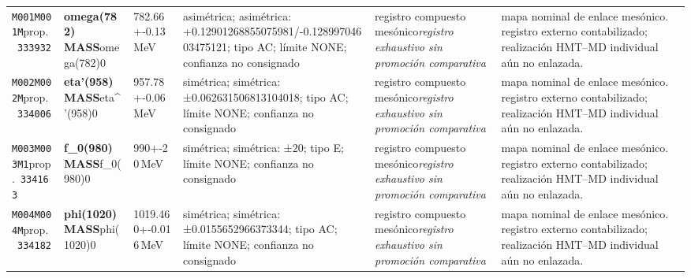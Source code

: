 \begin{landscape}
\begin{longtable}{L{1.85cm}L{4.45cm}L{2.35cm}L{4.05cm}L{3.35cm}L{7.15cm}}
\texttt{M001}\newline \texttt{M001M}\newline prop.\ \texttt{333932} & \textbf{omega(782) MASS}\newline omega(782)0 & 782.66+-0.13\,MeV & asimétrica; asimétrica: +0.12901268855075981/-0.12899704603475121; tipo AC; límite NONE; confianza no consignado & registro compuesto mesónico\newline \emph{registro exhaustivo sin promoción comparativa} & mapa nominal de enlace mesónico. registro externo contabilizado; realización HMT--MD individual aún no enlazada. \\
\texttt{M002}\newline \texttt{M002M}\newline prop.\ \texttt{334006} & \textbf{eta'(958) MASS}\newline eta\textasciicircum{}'(958)0 & 957.78+-0.06\,MeV & simétrica; simétrica: ±0.062631506813104018; tipo AC; límite NONE; confianza no consignado & registro compuesto mesónico\newline \emph{registro exhaustivo sin promoción comparativa} & mapa nominal de enlace mesónico. registro externo contabilizado; realización HMT--MD individual aún no enlazada. \\
\texttt{M003}\newline \texttt{M003M1}\newline prop.\ \texttt{334163} & \textbf{f\_\allowbreak{}0(980) MASS}\newline f\_\allowbreak{}0(980)0 & 990+-20\,MeV & simétrica; simétrica: ±20; tipo E; límite NONE; confianza no consignado & registro compuesto mesónico\newline \emph{registro exhaustivo sin promoción comparativa} & mapa nominal de enlace mesónico. registro externo contabilizado; realización HMT--MD individual aún no enlazada. \\
\texttt{M004}\newline \texttt{M004M}\newline prop.\ \texttt{334182} & \textbf{phi(1020) MASS}\newline phi(1020)0 & 1019.460+-0.016\,MeV & simétrica; simétrica: ±0.0155652966373344; tipo AC; límite NONE; confianza no consignado & registro compuesto mesónico\newline \emph{registro exhaustivo sin promoción comparativa} & mapa nominal de enlace mesónico. registro externo contabilizado; realización HMT--MD individual aún no enlazada. \\

\end{longtable}
\end{landscape}
